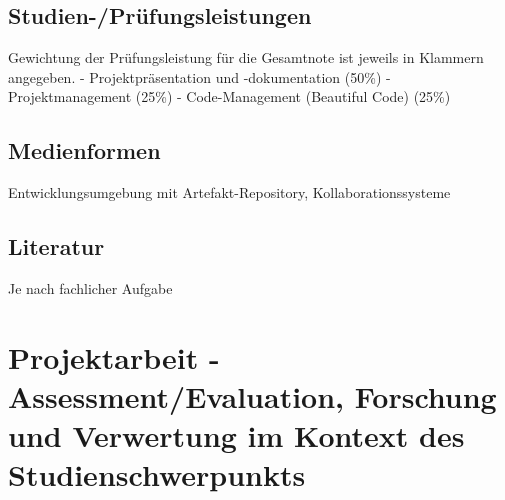 \section*{Studien-/Prüfungsleistungen\label{/mi-2017/modulbeschreibungen-master/MA_Modul_Projekt_Entwicklung}}\label{studien-pruxfcfungsleistungenpathlabelmi-2017modulbeschreibungen-mastermaux5fmodulux5fprojektux5fentwicklung}

Gewichtung der Prüfungsleistung für die Gesamtnote ist jeweils in
Klammern angegeben. - Projektpräsentation und -dokumentation (50\%) -
Projektmanagement (25\%) - Code-Management (Beautiful Code) (25\%)

\section*{Medienformen\label{/mi-2017/modulbeschreibungen-master/MA_Modul_Projekt_Entwicklung}}\label{medienformenpathlabelmi-2017modulbeschreibungen-mastermaux5fmodulux5fprojektux5fentwicklung}

Entwicklungsumgebung mit Artefakt-Repository, Kollaborationssysteme

\section*{Literatur\label{/mi-2017/modulbeschreibungen-master/MA_Modul_Projekt_Entwicklung}}\label{literaturpathlabelmi-2017modulbeschreibungen-mastermaux5fmodulux5fprojektux5fentwicklung}

Je nach fachlicher Aufgabe

\chapter{Projektarbeit - Assessment/Evaluation, Forschung und Verwertung
im Kontext des
Studienschwerpunkts\label{/mi-2017/modulbeschreibungen-master/MA_Modul_Projekt_Verwertung}}\label{projektarbeit---assessmentevaluation-forschung-und-verwertung-im-kontext-des-studienschwerpunktspathlabelmi-2017modulbeschreibungen-mastermaux5fmodulux5fprojektux5fverwertung}

